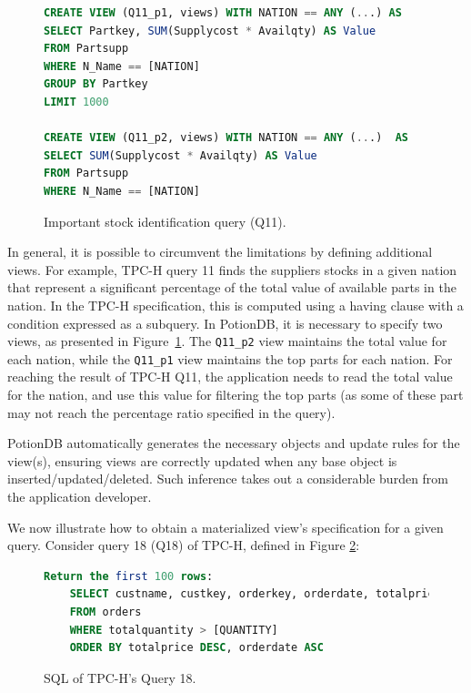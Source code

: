 \documentclass[sigplan,review,anonymous]{acmart}
\begin{document}
\begin{figure}[h]
	\begin{lstlisting}[language=SQL]
CREATE VIEW (Q11_p1, views) WITH NATION == ANY (...) AS
SELECT Partkey, SUM(Supplycost * Availqty) AS Value
FROM Partsupp
WHERE N_Name == [NATION]
GROUP BY Partkey
LIMIT 1000

CREATE VIEW (Q11_p2, views) WITH NATION == ANY (...)  AS
SELECT SUM(Supplycost * Availqty) AS Value
FROM Partsupp
WHERE N_Name == [NATION]
\end{lstlisting}
	\caption{Important stock identification query (Q11).}
	\label{fig:q5_view}
\end{figure}

In general, it is possible to circumvent the limitations by defining additional views.
For example, TPC-H query 11 finds the suppliers stocks in a given nation that represent a significant percentage of the total
value of available parts in the nation. In the TPC-H specification, this 
is computed using a having clause with a condition expressed as a subquery.
In PotionDB, it is necessary to specify two views, as presented in Figure~\ref{fig:q5_view}.
The \texttt{Q11\_p2} view maintains the total value for each nation, while the \texttt{Q11\_p1} view
maintains the top parts for each nation. For reaching the result of TPC-H Q11, the application needs
to read the total value for the nation, and use this value for filtering the top parts (as some of these part may not
reach the percentage ratio specified in the query).


PotionDB automatically generates the necessary objects and update rules for the view(s), ensuring views are 
correctly updated when any base object is inserted/updated/deleted.
Such inference takes out a considerable burden from the application developer.

We now illustrate how to obtain a materialized view’s specification for a given query. 
Consider query 18 (Q18) of TPC-H, defined in Figure \ref{fig:q18}:

\begin{figure}[h]
	\begin{lstlisting}[language=SQL]
	Return the first 100 rows:
	SELECT custname, custkey, orderkey, orderdate, totalprice, totalquantity
	FROM orders
	WHERE totalquantity > [QUANTITY]
	ORDER BY totalprice DESC, orderdate ASC
	\end{lstlisting}
	\caption{SQL of TPC-H's Query 18.}
	\label{fig:q18}
\end{figure}
\end{document}
